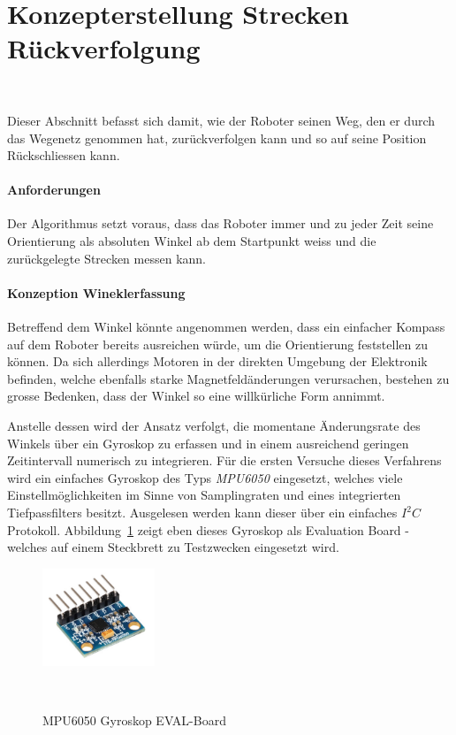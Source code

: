 \documentclass[main.tex]{subfiles} %
\begin{document}

\section{Konzepterstellung Strecken Rückverfolgung}~\label{appendix:Strecke_Tracken}

Dieser Abschnitt befasst sich damit, wie der Roboter seinen Weg, den er durch
das Wegenetz genommen hat, zurückverfolgen kann und so auf seine Position
Rückschliessen kann.

\paragraph{Anforderungen}
Der Algorithmus setzt voraus, dass das Roboter immer und zu jeder Zeit seine
Orientierung als absoluten Winkel ab dem Startpunkt weiss und die zurückgelegte
Strecken messen kann.

\paragraph{Konzeption Wineklerfassung}
Betreffend dem Winkel könnte angenommen werden, dass ein einfacher Kompass auf
dem Roboter bereits ausreichen würde, um die Orientierung feststellen zu
können. Da sich allerdings Motoren in der direkten Umgebung der Elektronik
befinden, welche ebenfalls starke Magnetfeldänderungen verursachen, bestehen zu
grosse Bedenken, dass der Winkel so eine willkürliche Form annimmt.

Anstelle dessen wird der Ansatz verfolgt, die momentane Änderungsrate des
Winkels über ein Gyroskop zu erfassen und in einem ausreichend geringen
Zeitintervall numerisch zu integrieren. Für die ersten Versuche dieses
Verfahrens wird ein einfaches Gyroskop des Typs \textit{MPU6050} eingesetzt,
welches viele Einstellmöglichkeiten im Sinne von Samplingraten und eines
integrierten Tiefpassfilters besitzt. Ausgelesen werden kann dieser über ein
einfaches $I^2C$ Protokoll. Abbildung~\ref{fig:MPU6050} zeigt eben dieses
Gyroskop als Evaluation Board - welches auf einem Steckbrett zu Testzwecken
eingesetzt wird.

\begin{figure}[H]
    \centering
    \includegraphics[width=0.3\textwidth]{./fig_Strecken_Tracken/MPU6050.png}
    \caption{MPU6050 Gyroskop EVAL-Board}~\label{fig:MPU6050}
\end{figure}
\end{document}
